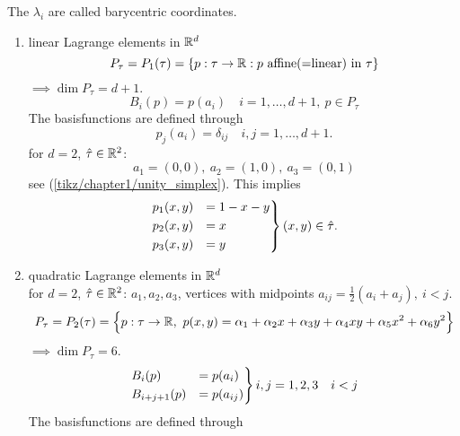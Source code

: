The $\lambda_i$ are called \glqq barycentric coordinates\grqq.


\begin{example}
	\begin{enumerate}[label=(\roman*)]
		\item linear Lagrange elements in $\mathbb{R}^d$
		\begin{equation*}
			P_{\tau} = P_1(\tau) = \left\{ p:\tau \to \mathbb{R}: p \text{ affine(=linear) in }\tau \right\} 
		\end{equation*}
		$\implies \dim P_{\tau} = d+1$.
		\begin{equation*}
			B_i(p) = p(a_i)\quad i = 1, \dots,d+1,\ p \in P_{\tau}
		\end{equation*}
		The basisfunctions are defined through
		\begin{equation*}
			p_j(a_i) = \delta_{ij} \quad i,j = 1,\dots ,d+1.
		\end{equation*}
		for \underline{$d=2$}, $\hat{\tau} \in \mathbb{R}^2$:
		\begin{equation*}
			a_1= (0,0),\ a_2 = (1,0),\ a_3 = (0,1)
		\end{equation*}
		see (\ref{tikz/chapter1/unity_simplex}). This implies
		\begin{equation*}
			\begin{rcases}
			p_1(x,y) &= 1-x-y\\
			p_2(x,y) &= x\\
			p_3(x,y) &= y
			\end{rcases}
			(x,y) \in \hat{\tau}.
		\end{equation*} 
		\item quadratic Lagrange elements in $\mathbb{R}^d$\\
		for \underline{$d=2$}, $\hat{\tau} \in \mathbb{R}^2$: $a_1,a_2,a_3$, vertices with midpoints $a_{ij} = \frac{1}{2}(a_i +a_j),\ i < j$.\\
		\begin{equation*}
			P_{\tau} = P_2(\tau) = \Big\{ p:\tau \to \mathbb{R},\ p(x,y) = \alpha_1 + \alpha_2 x + \alpha_3 y + \alpha_4 xy + \alpha_5 x^2 + \alpha_6 y^2 \Big\}
		\end{equation*}
		$\implies  \dim P_{\tau} = 6$.
		\begin{equation*}
			\begin{rcases}
			B_i(p) &= p(a_i)\\
			B_{i+j+1}(p) &= p(a_{ij})
			\end{rcases}
			i,j = 1,2,3 \quad i<j
		\end{equation*}
		The basisfunctions are defined through 
		\begin{align*}

\end{align*}
\end{enumerate}
\end{example}
